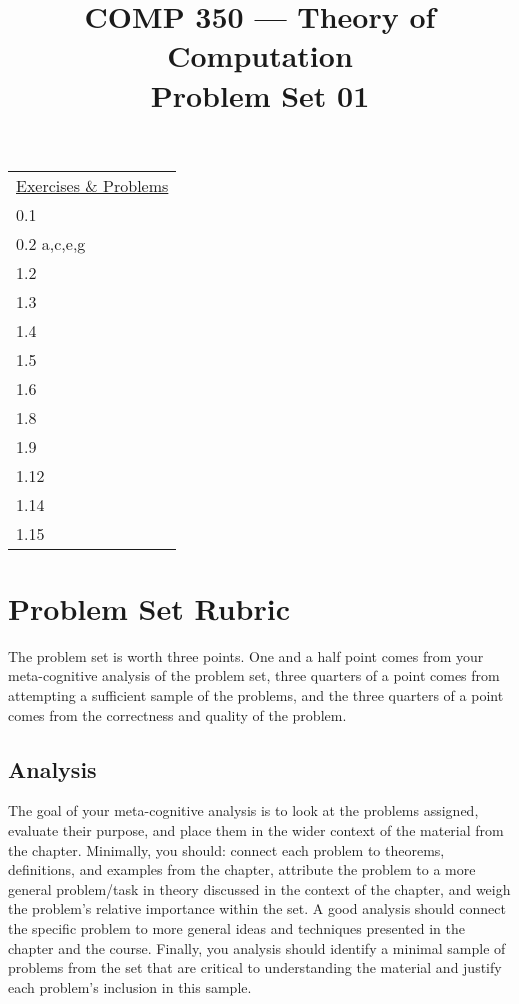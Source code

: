 \documentclass[nobib]{tufte-handout}
\title{COMP 350 --- Theory of Computation \\ Problem Set 01}
\begin{document}
\maketitle

\begin{center}
\begin{tabular}{l}
  \underline{Exercises \& Problems} \\
  0.1 \\
  0.2 a,c,e,g \\
  1.2 \\
  1.3 \\
  1.4 \\
  1.5 \\
  1.6 \\
  1.8 \\
  1.9 \\
  1.12 \\
  1.14 \\
  1.15
\end{tabular}
\end{center}

\section*{Problem Set Rubric}

The problem set is worth three points.  One and a half point comes from your meta-cognitive analysis of the problem set, three quarters of a point comes from attempting a sufficient sample of the problems, and the three quarters of a point comes from the correctness and quality of the problem.

\subsection*{Analysis}

The goal of your meta-cognitive analysis is to look at the problems assigned, evaluate their purpose, and place them in the wider context of the material from the chapter. Minimally, you should: connect each problem to theorems, definitions, and examples from the chapter, attribute the problem to a more general problem/task in theory discussed in the context of the chapter, and weigh the problem's relative importance within the set. A good analysis should connect the specific problem to more general ideas and techniques presented in the chapter and the course. Finally, you analysis should identify a minimal sample of problems from the set that are critical to understanding the material and justify each problem's inclusion in this sample.
\end{document}
